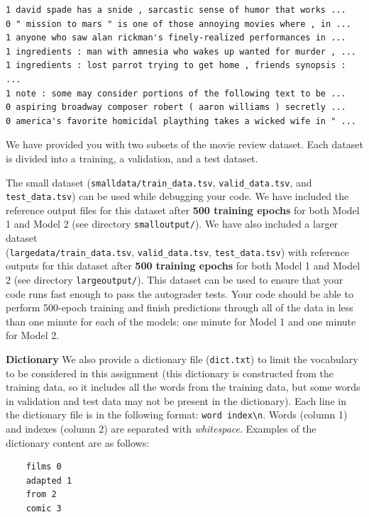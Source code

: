 \documentclass[11pt,addpoints,answers]{exam}
\begin{document}
\begin{lstlisting}
1 david spade has a snide , sarcastic sense of humor that works ... 
0 " mission to mars " is one of those annoying movies where , in ...
1 anyone who saw alan rickman's finely-realized performances in ...
1 ingredients : man with amnesia who wakes up wanted for murder , ...
1 ingredients : lost parrot trying to get home , friends synopsis : ... 
1 note : some may consider portions of the following text to be ...
0 aspiring broadway composer robert ( aaron williams ) secretly ...
0 america's favorite homicidal plaything takes a wicked wife in " ...
\end{lstlisting}

We have provided you with two subsets of the movie review dataset. Each dataset is divided into a training, a validation, and a test dataset.

The small dataset (\lstinline{smalldata/train_data.tsv}, \lstinline{valid_data.tsv}, and \lstinline{test_data.tsv}) can be used while debugging your code. We have included the reference output files for this dataset after \textbf{500 training epochs} for both Model 1 and Model 2 (see directory \lstinline{smalloutput/}). 
%
We have also included a larger dataset \\(\lstinline{largedata/train_data.tsv}, \lstinline{valid_data.tsv}, \lstinline{test_data.tsv}) with reference outputs for this dataset after \textbf{500 training epochs} for both Model 1 and Model 2 (see directory \lstinline{largeoutput/}). This dataset can be used to ensure that your code runs fast enough to pass the autograder tests. Your code should be able to perform 500-epoch training and finish  predictions through all of the data in less than one minute for each of the models: one minute for Model 1 and one minute for Model 2.

  {\bf Dictionary } We also provide a dictionary file (\lstinline{dict.txt}) to limit the vocabulary to be considered in this assignment (this dictionary is constructed from the training data, so it includes all the words from the training data, but some words in validation and test data may not be present in the dictionary). Each line in the dictionary file is in the following format: \lstinline{word index\n}. Words (column 1) and indexes (column 2) are separated with \emph{whitespace}. Examples of the dictionary content are as follows: 
    \begin{lstlisting}
    films 0
    adapted 1
    from 2
    comic 3
    \end{lstlisting}
 
\end{document}
